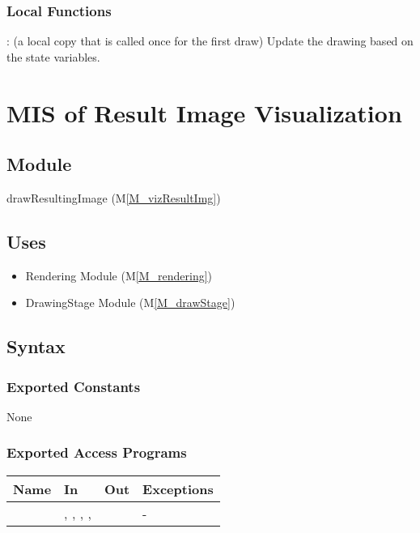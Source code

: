 \documentclass[12pt, titlepage]{article}
\newcommand{\mref}[1]{M\ref{#1}}
\newcommand{\mrefp}[1]{(\mref{#1})}
\newcommand{\mreff}[1]{Module \mrefp{#1}}
\begin{document}
\subsubsection{Local Functions}
: (a local copy that is called once for the first draw)
  Update the drawing based on the state variables.

\newpage



\section{MIS of Result Image Visualization} \label{MS_vizResultImg}

\subsection{Module}
drawResultingImage \mrefp{M_vizResultImg}

\subsection{Uses}
\begin{itemize}
  \item Rendering \mreff{M_rendering}
  \item DrawingStage \mreff{M_drawStage}
\end{itemize}

\subsection{Syntax}

\subsubsection{Exported Constants}
None
\subsubsection{Exported Access Programs}

\begin{center}
\begin{tabular}{L{5cm} L{4cm} L{4cm} L{2cm}}
\hline
\textbf{Name} & \textbf{In} & \textbf{Out} & \textbf{Exceptions} \\
\hline
{} & , , ,
  ,  &  & - \\
\hline
\end{tabular}
\end{center}
\end{document}
